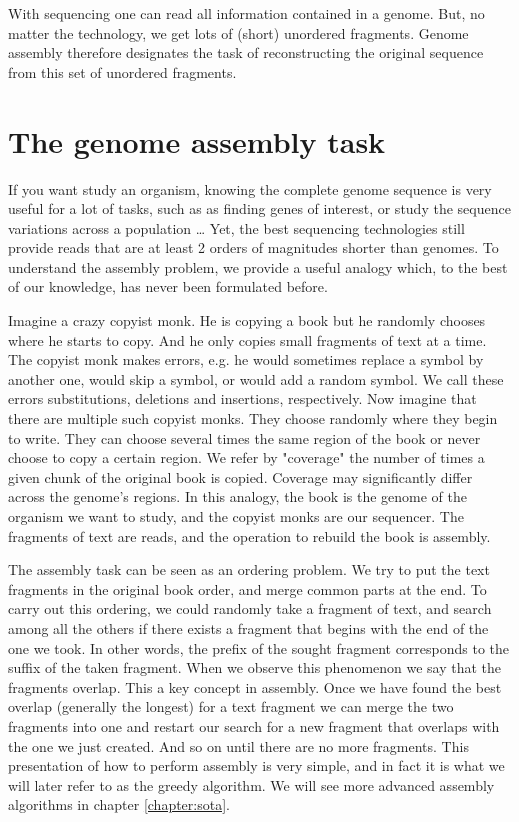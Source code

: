\documentclass[./main.tex]{subfiles}
\begin{document}
With sequencing one can read all information contained in a genome. But, no matter the technology, we get lots of (short) unordered fragments. Genome assembly therefore designates the task of reconstructing the original sequence from this set of unordered fragments. %

\section{The genome assembly task} \label{intro:sec:analogy}

If you want study an organism, knowing the complete genome sequence is very useful for a lot of tasks, such as as finding 
genes of interest, or study the sequence variations across a population \ldots %
Yet, the best sequencing technologies still provide reads that are at least 2 orders of magnitudes shorter than genomes. To understand the assembly problem, we provide a useful analogy which, to the best of our knowledge, has never been formulated before.

Imagine a crazy copyist monk. He is copying a book but he randomly chooses where he starts to copy. And he only copies small fragments of text at a time.
The copyist monk makes errors, e.g. he would sometimes replace a symbol by another one, would skip a symbol, or would add a random symbol. We call these errors substitutions, deletions and insertions, respectively.
Now imagine that there are multiple such copyist monks.
They choose randomly where they begin to write. They can choose several times the same region of the book or never choose to copy a certain region.
We refer by "coverage" the number of times a given chunk of the original book is copied. Coverage may significantly differ across the genome's regions. %
In this analogy, the book is the genome of the organism we want to study, and the copyist monks are our sequencer. The fragments of text are reads, and the operation to rebuild the book is assembly.

The assembly task can be seen as an ordering problem. %
We try to put the text fragments in the original book order, and merge common parts at the end. %
To carry out this ordering, we could randomly take a fragment of text, and search among all the others if there exists a fragment that begins with the end of the one we took. In other words, the prefix of the sought fragment corresponds to the suffix of the taken fragment. When we observe this phenomenon we say that the fragments overlap. This a key concept in assembly. Once we have found the best overlap (generally the longest) for a text fragment we can merge the two fragments into one and restart our search for a new fragment that overlaps with the one we just created. And so on until there are no more fragments. This presentation of how to perform assembly is very simple, and in fact it is what we will later refer to as the greedy algorithm. We will see more advanced assembly algorithms in chapter \ref{chapter:sota}.
\end{document}
